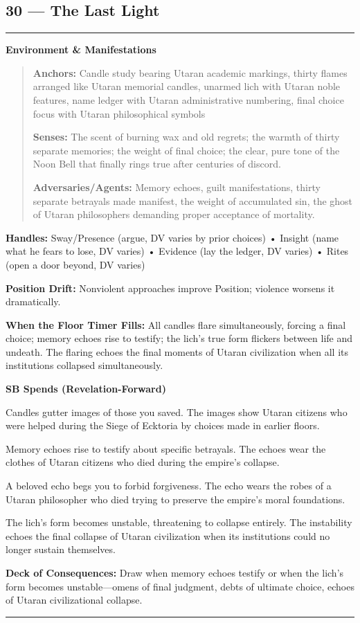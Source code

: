 \documentclass[18pt, letterpaper, twoside]{article}
\newenvironment{floorbox}[1]{%
    \begin{center}
    \begin{minipage}{0.95\textwidth}
    \subsection*{#1}
    \vspace{-0.5em}
    \rule{\textwidth}{0.5pt}
    \vspace{0.5em}
}{%
    \vspace{0.5em}
    \rule{\textwidth}{0.5pt}
    \end{minipage}
    \end{center}
}
\newenvironment{gmnote}[1]{%
    \vspace{0.5em}
    \noindent\textbf{#1}
    \begin{quote}
}{%
    \end{quote}
    \vspace{0.5em}
}
\newcommand{\handles}[1]{\noindent\textbf{Handles:} #1\par}
\newcommand{\sbitem}[2]{\item[#1 SB:] #2}
\newcommand{\deckdraw}[1]{\noindent\textbf{Deck of Consequences:} #1\par}
\begin{document}
\begin{floorbox}{30 --- The Last Light}
\begin{gmnote}{Environment \& Manifestations}
\textbf{Anchors:} Candle study bearing Utaran academic markings, thirty flames arranged like Utaran memorial candles, unarmed lich with Utaran noble features, name ledger with Utaran administrative numbering, final choice focus with Utaran philosophical symbols

\textbf{Senses:} The scent of burning wax and old regrets; the warmth of thirty separate memories; the weight of final choice; the clear, pure tone of the Noon Bell that finally rings true after centuries of discord.

\textbf{Adversaries/Agents:} Memory echoes, guilt manifestations, thirty separate betrayals made manifest, the weight of accumulated sin, the ghost of Utaran philosophers demanding proper acceptance of mortality.
\end{gmnote}

\handles{Sway/Presence (argue, DV varies by prior choices) • Insight (name what he fears to lose, DV varies) • Evidence (lay the ledger, DV varies) • Rites (open a door beyond, DV varies)}

\textbf{Position Drift:} Nonviolent approaches improve Position; violence worsens it dramatically.

\textbf{When the Floor Timer Fills:} All candles flare simultaneously, forcing a final choice; memory echoes rise to testify; the lich's true form flickers between life and undeath. The flaring echoes the final moments of Utaran civilization when all its institutions collapsed simultaneously.

\textbf{SB Spends (Revelation-Forward)}
\begin{description}[leftmargin=*, style=unboxed]
    \sbitem{1}{Candles gutter images of those you saved. The images show Utaran citizens who were helped during the Siege of Ecktoria by choices made in earlier floors.}
    \sbitem{2}{Memory echoes rise to testify about specific betrayals. The echoes wear the clothes of Utaran citizens who died during the empire's collapse.}
    \sbitem{3}{A beloved echo begs you to forbid forgiveness. The echo wears the robes of a Utaran philosopher who died trying to preserve the empire's moral foundations.}
    \sbitem{4+}{The lich's form becomes unstable, threatening to collapse entirely. The instability echoes the final collapse of Utaran civilization when its institutions could no longer sustain themselves.}
\end{description}

\deckdraw{Draw when memory echoes testify or when the lich's form becomes unstable---omens of final judgment, debts of ultimate choice, echoes of Utaran civilizational collapse.}


\end{floorbox}
\end{document}
